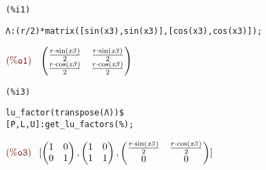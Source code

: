 \noindent
\begin{minipage}[t]{8ex}\color{red}\bf
\begin{verbatim}
(%i1) 
\end{verbatim}
\end{minipage}
\begin{minipage}[t]{\textwidth}\color{blue}
\begin{verbatim}
Λ:(r/2)*matrix([sin(x3),sin(x3)],[cos(x3),cos(x3)]);
\end{verbatim}
\end{minipage}

\noindent
\begin{math}\displaystyle
\parbox{8ex}{$\color{labelcolor}\mathrm{\tt (\%o1) }\quad $}
\begin{pmatrix}\frac{r\cdot \mathrm{sin}\left( \mathit{x3}\right) }{2} & \frac{r\cdot \mathrm{sin}\left( \mathit{x3}\right) }{2}\cr \frac{r\cdot \mathrm{cos}\left( \mathit{x3}\right) }{2} & \frac{r\cdot \mathrm{cos}\left( \mathit{x3}\right) }{2}\end{pmatrix}\mbox{}
\end{math}


\noindent
\begin{minipage}[t]{8ex}\color{red}\bf
\begin{verbatim}
(%i3) 
\end{verbatim}
\end{minipage}
\begin{minipage}[t]{\textwidth}\color{blue}
\begin{verbatim}
lu_factor(transpose(Λ))$
[P,L,U]:get_lu_factors(%);
\end{verbatim}
\end{minipage}

\noindent
\begin{math}\displaystyle
\parbox{8ex}{$\color{labelcolor}\mathrm{\tt (\%o3) }\quad $}
[\begin{pmatrix}1 & 0\cr 0 & 1\end{pmatrix},\begin{pmatrix}1 & 0\cr 1 & 1\end{pmatrix},\begin{pmatrix}\frac{r\cdot \mathrm{sin}\left( \mathit{x3}\right) }{2} & \frac{r\cdot \mathrm{cos}\left( \mathit{x3}\right) }{2}\cr 0 & 0\end{pmatrix}]\mbox{}
\end{math}


